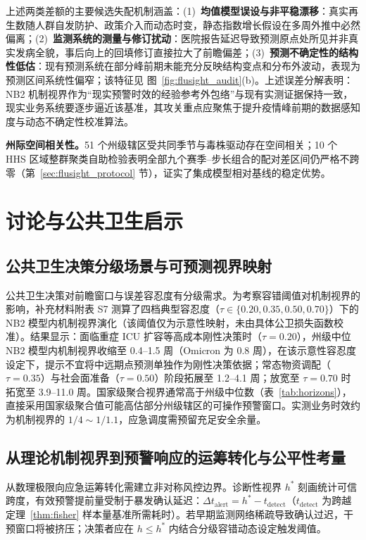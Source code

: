 \documentclass[11pt,a4paper]{article}
\theoremstyle{plain}
\theoremstyle{definition}
\begin{document}
上述两类差额的主要候选失配机制涵盖：(1)~\textbf{均值模型误设与非平稳漂移}：真实再生数随人群自发防护、政策介入而动态时变，静态指数增长假设在多周外推中必然偏离；(2)~\textbf{监测系统的测量与修订扰动}：医院报告延迟导致预测原点处所见并非真实发病全貌，事后向上的回填修订直接拉大了前瞻偏差；(3)~\textbf{预测不确定性的结构性低估}：现有预测系统在部分峰前期未能充分反映结构变点和分布外波动，表现为预测区间系统性偏窄；该特征见 图~\ref{fig:flusight_audit}(b)。上述误差分解表明：NB2 机制视界作为“现实预警时效的经验参考外包络”与现有实测证据保持一致，现实业务系统要逐步逼近该基准，其攻关重点应聚焦于提升疫情峰前期的数据感知度与动态不确定性校准算法。

\noindent\textbf{州际空间相关性。}51 个州级辖区受共同季节与毒株驱动存在空间相关；10 个 HHS 区域整群聚类自助检验表明全部九个赛季--步长组合的配对差区间仍严格不跨零（第~\ref{sec:flusight_protocol} 节），证实了集成模型相对基线的稳定优势。

\section{讨论与公共卫生启示}\label{sec:discussion}

\subsection{公共卫生决策分级场景与可预测视界映射}

公共卫生决策对前瞻窗口与误差容忍度有分级需求。为考察容错阈值对机制视界的影响，补充材料附表 S7 测算了四档典型容忍度（$\tau \in \{0.20, 0.35, 0.50, 0.70\}$）下的 NB2 模型内机制视界演化（该阈值仅为示意性映射，未由具体公卫损失函数校准）。结果显示：面临重症 ICU 扩容等高成本刚性决策时（$\tau = 0.20$），州级中位 NB2 模型内机制视界收缩至 0.4--1.5 周（Omicron 为 0.8 周），在该示意性容忍度设定下，提示不宜将中远期点预测单独作为刚性决策依据；常态物资调配（$\tau = 0.35$）与社会面准备（$\tau = 0.50$）阶段拓展至 1.2--4.1 周；放宽至 $\tau = 0.70$ 时拓宽至 3.9--11.0 周。国家级聚合视界通常高于州级中位数（表~\ref{tab:horizons}），直接采用国家级聚合值可能高估部分州级辖区的可操作预警窗口。实测业务时效约为机制视界的 $1/4\sim 1/1.1$，应急调度需预留充足安全余量。

\subsection{从理论机制视界到预警响应的运筹转化与公平性考量}\label{sec:operational_translation}

从数理极限向应急运筹转化需建立非对称风控边界\citep{parag2025asymmetric}。诊断性视界 $h^*$ 刻画统计可信跨度，有效预警提前量受制于暴发确认延迟：$\Delta t_{\text{alert}} = h^* - t_{\text{detect}}$（$t_{\text{detect}}$ 为跨越定理~\ref{thm:fisher} 样本量基准所需耗时）。若早期监测网络稀疏导致确认过迟，干预窗口将被挤压；决策者应在 $h \le h^*$ 内结合分级容错动态设定触发阈值。
\end{document}
